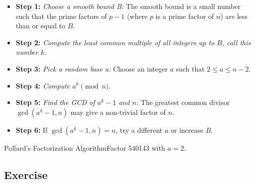 \begin{itemize}
    \item \textbf{Step 1:} \textit{Choose a smooth bound B:} The smooth bound is a small number such that the prime factors of \(p - 1\) (where \(p\) is a prime factor of \(n\)) are less than or equal to \(B\).
    \item \textbf{Step 2:} \textit{Compute the least common multiple of all integers up to \(B\), call this number \(k\).}
    \item \textbf{Step 3:} \textit{Pick a random base a:} Choose an integer \(a\) such that \(2 \leq a \leq n - 2\).
    \item \textbf{Step 4:} \textit{Compute \(a^{k} \pmod{n}\)}.
    \item \textbf{Step 5:} \textit{Find the GCD of \(a^k - 1\) and \(n\):} The greatest common divisor \(\gcd(a^k - 1, n)\) may give a non-trivial factor of \(n\).
    \item \textbf{Step 6:} If \(\gcd(a^k - 1,n) = n\), try a different \(a\) or increase \(B\).
\end{itemize}

\begin{example}
    {Pollard's Factorization Algorithm}Factor 540143 with \(a = 2\).
\end{example}


\renewcommand{\theenumi}{\alph{enumi}}
\renewcommand{\labelenumi}{(\theenumi)}
\subsection{Exercise}

